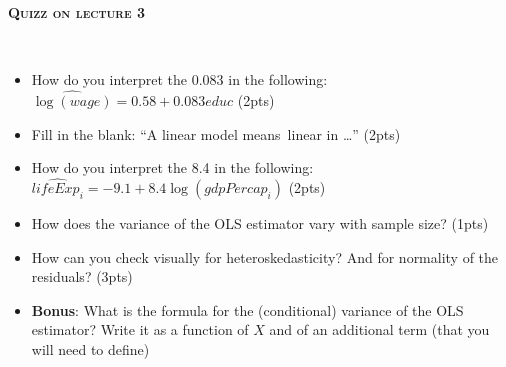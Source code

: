 \documentclass[a4, 12pt]{report}
\begin{document}



\begin{center}
	\Huge \textbf{\textsc{Quizz on lecture 3}}
\end{center}
\normalsize
		~\\
		
	\begin{itemize}
		\item How do you interpret the 0.083 in the following: $\widehat{\log(wage)} = 0.58 + 0.083 educ$ (2pts)
			\vspace{3cm}
		\item  Fill in the blank: “A linear model means linear in …” (2pts)
			\vspace{1.5cm}
		\item  How do you interpret the 8.4 in the following: $\widehat{lifeExp_i} = -9.1 + 8.4 \log(gdpPercap_i)$ (2pts)
			\vspace{3cm}
		\item How does the variance of the OLS estimator vary with  sample size? (1pts)
			\vspace{1.5cm}
		\item How can you check visually for heteroskedasticity? And for normality of the residuals? (3pts)
			\vspace{3.5cm}
		\item \textbf{Bonus}: What is the formula for the (conditional) variance of the OLS estimator? Write it as a function of $X$ and of an additional term (that you will need to define)
			\vspace{3cm}
	\end{itemize}
		
		
				
		

				
				
				
\end{document}
